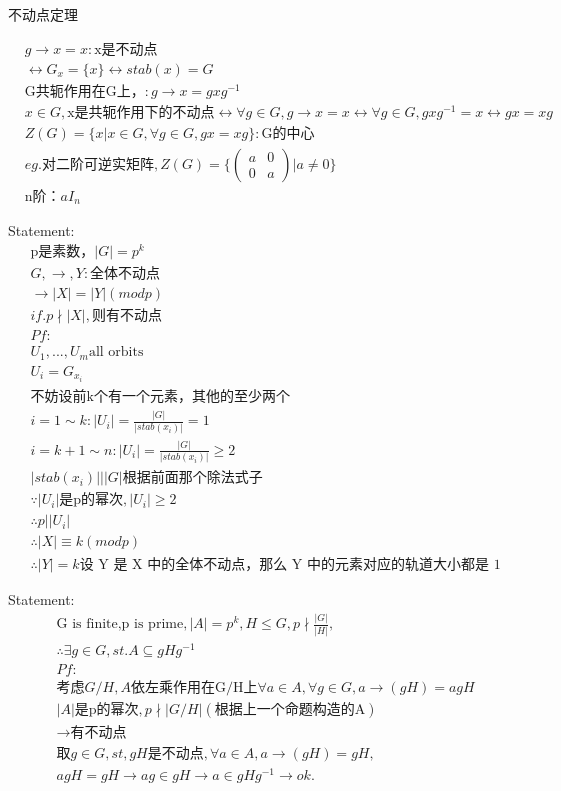 \documentclass[12pt, a4paper]{article}  %
\begin{document}
不动点定理

\begin{align}
    &g\rightarrow x=x:\text{x是不动点}\\
    &\leftrightarrow G_x=\{x\}\leftrightarrow stab(x)=G\\
    &\text{G共轭作用在G上，}:g\rightarrow x=gxg^{-1}\\
    &x\in G,\text{x是共轭作用下的不动点}\leftrightarrow \forall g\in G,g\rightarrow x=x\leftrightarrow \forall g\in G,gxg^{-1}=x\leftrightarrow gx=xg\\
    &Z(G)=\{x|x\in G,\forall g\in G,gx=xg\}:\text{G的中心}\\
    &eg.\text{对二阶可逆实矩阵},Z(G)=\{\begin{pmatrix}
        a&0\\
        0&a
    \end{pmatrix}|a\neq 0\}\\
    &\text{n阶：}aI_n
\end{align}

Statement:
\begin{align}
    &\text{p是素数，}|G|=p^k\\
    & G,\rightarrow,Y:\text{全体不动点}\\
    &\rightarrow|X|=|Y|(mod p)\\
    &if. p\nmid |X|,\text{则有不动点}\\
    &Pf:\\
    &U_1,...,U_m\text{all orbits}\\
    &U_i=G_{x_i}\\
    &\text{不妨设前k个有一个元素，其他的至少两个}\\
    &i=1\sim k:|U_i|=\frac{|G|}{|stab(x_i)|}=1\\
    &i=k+1\sim n:|U_i|=\frac{|G|}{|stab(x_i)|}\geqslant 2\\
    &|stab(x_i)|||G|\text{根据前面那个除法式子}\\
    &\because |U_i|\text{是p的幂次},|U_i|\geqslant 2\\
    &\therefore p||U_i|\\
    &\therefore |X|\equiv k(mod p)\\
    &\therefore |Y|=k\text{设 Y 是 X 中的全体不动点，那么 Y 中的元素对应的轨道大小都是 1}
\end{align}

Statement:
\begin{align}
    &\text{G is finite,p is prime},|A|=p^k,H\leqslant G,p\nmid\frac{|G|}{|H|},\\
    &\therefore \exists g\in G,st. A\subseteq gHg^{-1}\\
    &Pf:\\
    &\text{考虑}G/H,A\text{依左乘作用在G/H上}\forall a\in A,\forall g \in G,a\rightarrow(gH)=agH\\
    &|A|\text{是p的幂次},p\nmid |G/H|(\text{根据上一个命题构造的A})\\
    &\rightarrow \text{有不动点}\\
    &\text{取}g\in G,st, gH\text{是不动点},\forall a\in A,a\rightarrow(gH)=gH,\\
    &agH=gH\rightarrow ag\in gH\rightarrow a\in gHg^{-1}\rightarrow ok.
\end{align}
\end{document}
